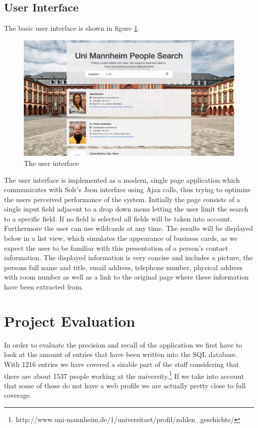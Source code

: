 \documentclass[11pt,titlepage,oneside,openany]{article}
\begin{document}
\subsection{User Interface}
The basic user interface is shown in figure \ref{fig:ui}. 

\begin{figure}[hbt]
  \begin{center}
   \includegraphics[width=1.0\textwidth]{figures/ui.png}
  \end{center}
  \caption{The user interface}
    \label{fig:ui}
\end{figure}

The user interface is implemented as a modern, single page application which communicates with Solr’s Json interface using Ajax calls, thus trying to optimize the users perceived performance of the system. Initially the page consists of a single input field adjacent to a drop down menu letting the user limit the search to a specific field. If no field is selected all fields will be taken into account. Furthermore the user can use wildcards at any time.
The results will be displayed below in a list view, which simulates the appearance of business cards, as we expect the user to be familiar with this presentation of a person's contact information. The displayed information is very concise and includes a picture, the persons full name and title, email address, telephone number, physical address with room number as well as a link to the original page where these information have been extracted from.

\section{Project Evaluation}
In order to evaluate the precision and recall of the application we first have to look at the amount of entries that have been written into the SQL database. With 1216 entries we have covered a sizable part of the staff considering that there are about 1537 people working at the university.\footnote{http://www.uni-mannheim.de/1/universitaet/profil/zahlen\_geschichte/} If we take into account that some of those do not have a web profile we are actually pretty close to full coverage.
\end{document}
